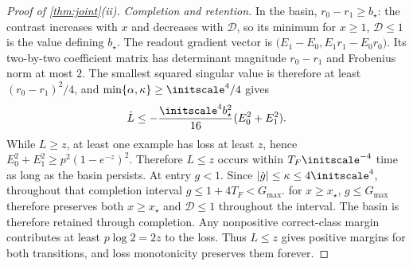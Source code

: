\begin{proof}[Proof of \cref{thm:joint}(ii)]
\emph{Completion and retention.}
In the basin, $r_0-r_1\ge b_\star$: the contrast increases with $x$ and decreases with $\mathcal D$, so its minimum for $x\ge1$, $\mathcal D\le1$
is the value defining $b_\star$. The readout gradient vector is
$\bigl(E_1-E_0,E_1r_1-E_0r_0\bigr)$.
Its two-by-two coefficient matrix has determinant magnitude $r_0-r_1$ and Frobenius norm at most $2$.
The smallest squared singular value is therefore at least $(r_0-r_1)^2/4$, and
$\min\{\alpha,\kappa\}\ge\initscale^4/4$ gives
\[
 \dot L\le-\frac{\initscale^4b_\star^2}{16}(E_0^2+E_1^2).
\]
While $L\ge z$, at least one example has loss at least $z$, hence
$E_0^2+E_1^2\ge p^2(1-e^{-z})^2$. Therefore $L\le z$ occurs within $T_F\initscale^{-4}$ time as long as the basin persists.
At entry $g<1$. Since $|\dot g|\le\kappa\le4\initscale^4$, throughout that completion interval
$g\le1+4T_F<G_{\max}$.  for $x\ge x_\star$, $g\le G_{\max}$ therefore preserves both $x\ge x_\star$ and $\mathcal D\le1$ throughout the interval.
The basin is therefore retained through completion.
Any nonpositive correct-class margin contributes at least $p\log2=2z$ to the loss. Thus $L\le z$ gives positive margins for both transitions, and loss monotonicity preserves them forever.
\end{proof}


